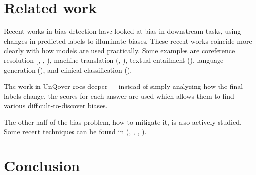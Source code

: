 \documentclass{article}
\begin{document}
\section{Related work}

Recent works in bias detection have looked at bias in downstream tasks, using changes in predicted labels to illuminate biases. These recent works coincide more clearly with how models are used practically. Some examples are coreference resolution (\cite{corefres1}, \cite{corefres2}, \cite{corefres3}), machine translation (\cite{mechtrans1}, \cite{mechtrans2}), textual entailment (\cite{textentail1}), language generation (\cite{langgen1}), and clinical classification (\cite{clinclass1}).

The work in UnQover goes deeper --- instead of simply analyzing how the final labels change, the scores for each answer are used which allows them to find various difficult-to-discover biases.

The other half of the bias problem, how to mitigate it, is also actively studied. Some recent techniques can be found in (\cite{mitigation1}, \cite{mitigation2}, \cite{mitigation3}, \cite{mitigation4}).

\section{Conclusion}






\end{document}
